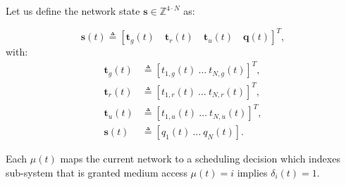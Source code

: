 Let us define the network state $\boldsymbol{s} \in \mathbb{Z}^{4\cdot N}$ as:

\begin{equation}
  \boldsymbol{s}(t) \triangleq \left[\boldsymbol{t}_g(t) \quad \boldsymbol{t}_r(t) \quad \boldsymbol{t}_u(t) \quad \boldsymbol{q}(t)\right]^T, 
\end{equation} 
with: 
\begin{align}
  \boldsymbol{t}_g(t) &\triangleq \left[ t_{1,g}(t) ~ \dots ~ t_{N,g}(t) \right]^T ,\\
  \boldsymbol{t}_r(t) &\triangleq \left[ t_{1,r}(t) ~ \dots ~ t_{N,r}(t) \right]^T ,\\
  \boldsymbol{t}_u(t) &\triangleq \left[ t_{1,u}(t) ~ \dots ~ t_{N,u}(t) \right]^T ,\\
  \boldsymbol{s}(t) &\triangleq \left[ q_1(t) ~ \dots ~ q_N(t) \right].
\end{align}

Each $\mu(t)$ maps the current network to a scheduling decision which indexes
sub-system that is granted medium access $\mu(t)=i$ implies
$\delta_i(t)=1$. 
